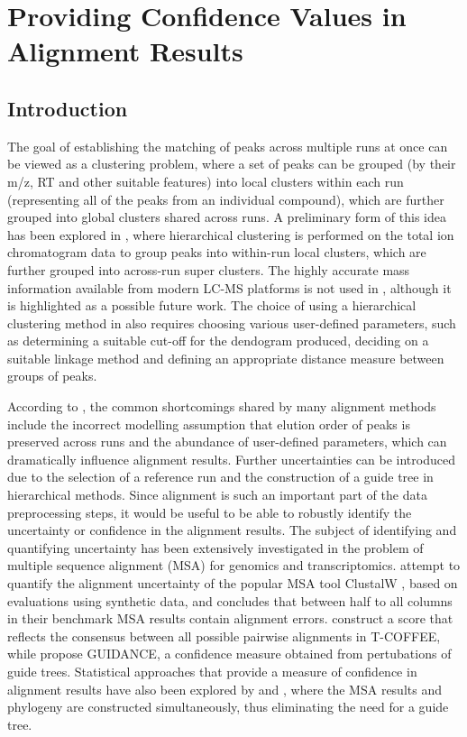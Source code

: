 \chapter{Providing Confidence Values in Alignment Results}
\label{c:hdp}

\section{Introduction}

The goal of establishing the matching of peaks across multiple runs at once can be viewed as a clustering problem, where a set of peaks can be grouped (by their m/z, RT and other suitable features) into local clusters within each run (representing all of the peaks from an individual compound), which are further grouped into global clusters shared across runs. A preliminary form of this idea has been explored in \cite{DeSouza2006}, where hierarchical clustering is performed on the total ion chromatogram data to group peaks into within-run local clusters, which are further grouped into across-run super clusters. The highly accurate mass information available from modern LC-MS platforms is not used in \cite{DeSouza2006}, although it is highlighted as a possible future work. The choice of using a hierarchical clustering method in \cite{DeSouza2006} also requires choosing various user-defined parameters, such as determining a suitable cut-off for the dendogram produced, deciding on a suitable linkage method and defining an appropriate distance measure between groups of peaks.

According to \cite{Smith2013}, the common shortcomings shared by many alignment methods include the incorrect modelling assumption that elution order of peaks is preserved across runs and the abundance of user-defined parameters, which can dramatically influence alignment results. Further uncertainties can be introduced due to the selection of a reference run and the construction of a guide tree in hierarchical methods. Since alignment is such an important part of the data preprocessing steps, it would be useful to be able to robustly identify the uncertainty or confidence in the alignment results. The subject of identifying and quantifying uncertainty has been extensively investigated in the problem of multiple sequence alignment (MSA) for genomics and transcriptomics. \cite{Landan2009} attempt to quantify the alignment uncertainty of the popular MSA tool ClustalW \cite{Thompson1994}, based on evaluations using synthetic data, and concludes that between half to all columns in their benchmark MSA results contain alignment errors. \cite{Notredame2000} construct a score that reflects the consensus between all possible pairwise alignments in T-COFFEE, while \cite{Penn2010} propose GUIDANCE, a confidence measure obtained from pertubations of guide trees. Statistical approaches that provide a measure of confidence in alignment results have also been explored by \cite{Redelings2005} and \cite{Bradley2009}, where the MSA results and phylogeny are constructed simultaneously, thus eliminating the need for a guide tree. 


